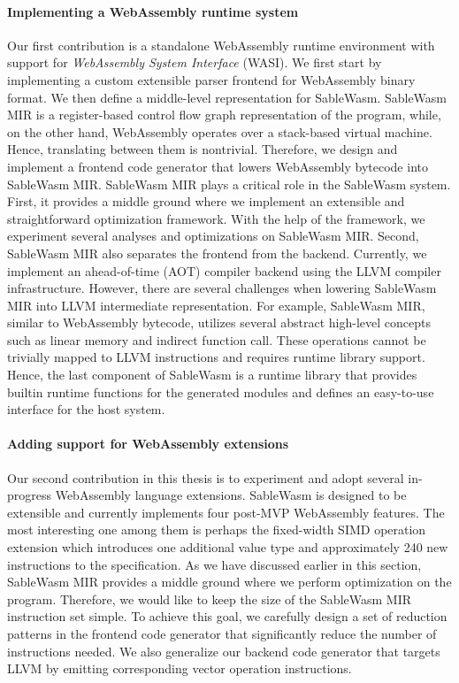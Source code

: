 \paragraph{Implementing a WebAssembly runtime system}
Our first contribution is a standalone WebAssembly runtime environment with
support for \emph{WebAssembly System Interface} (WASI). We first start by
implementing a custom extensible parser frontend for WebAssembly binary format.
We then define a middle-level representation for SableWasm. SableWasm MIR is a
register-based control flow graph representation of the program, while, on the
other hand, WebAssembly operates over a stack-based virtual machine. Hence,
translating between them is nontrivial. Therefore, we design and implement a
frontend code generator that lowers WebAssembly bytecode into SableWasm MIR.
SableWasm MIR plays a critical role in the SableWasm system. First, it provides
a middle ground where we implement an extensible and straightforward
optimization framework. With the help of the framework, we experiment several
analyses and optimizations on SableWasm MIR. Second, SableWasm MIR also
separates the frontend from the backend. Currently, we implement an
ahead-of-time (AOT) compiler backend using the LLVM compiler infrastructure.
However, there are several challenges when lowering SableWasm MIR into LLVM
intermediate representation. For example, SableWasm MIR, similar to WebAssembly
bytecode, utilizes several abstract high-level concepts such as linear memory
and indirect function call. These operations cannot be trivially mapped to LLVM
instructions and requires runtime library support. Hence, the last component of
SableWasm is a runtime library that provides builtin runtime functions for the
generated modules and defines an easy-to-use interface for the host system.

\paragraph{Adding support for WebAssembly extensions}
Our second contribution in this thesis is to experiment and adopt several
in-progress WebAssembly language extensions. SableWasm is designed to be
extensible and currently implements four post-MVP WebAssembly features. The
most interesting one among them is perhaps the fixed-width SIMD operation
extension which introduces one additional value type and approximately 240
new instructions to the specification. As we have discussed earlier in this
section, SableWasm MIR provides a middle ground where we perform optimization
on the program. Therefore, we would like to keep the size of the SableWasm MIR
instruction set simple. To achieve this goal, we carefully design a set of
reduction patterns in the frontend code generator that significantly reduce the
number of instructions needed. We also generalize our backend code generator
that targets LLVM by emitting corresponding vector operation instructions.

